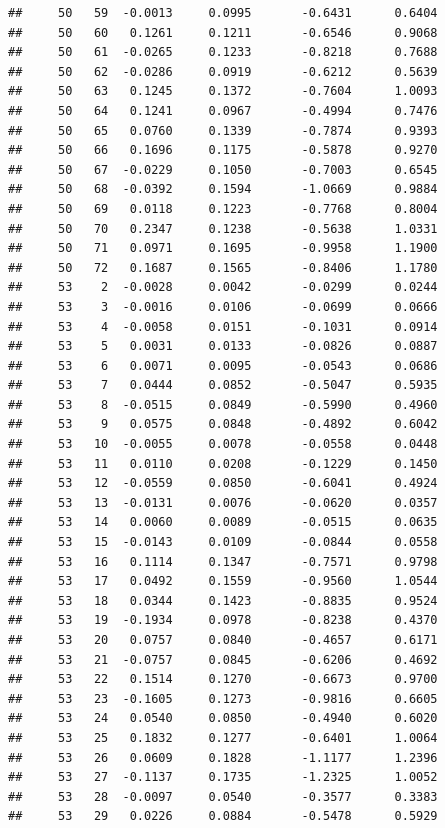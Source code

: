 \documentclass[
]{article}
\begin{document}
\begin{verbatim}
##     50   59  -0.0013     0.0995       -0.6431      0.6404 
##     50   60   0.1261     0.1211       -0.6546      0.9068 
##     50   61  -0.0265     0.1233       -0.8218      0.7688 
##     50   62  -0.0286     0.0919       -0.6212      0.5639 
##     50   63   0.1245     0.1372       -0.7604      1.0093 
##     50   64   0.1241     0.0967       -0.4994      0.7476 
##     50   65   0.0760     0.1339       -0.7874      0.9393 
##     50   66   0.1696     0.1175       -0.5878      0.9270 
##     50   67  -0.0229     0.1050       -0.7003      0.6545 
##     50   68  -0.0392     0.1594       -1.0669      0.9884 
##     50   69   0.0118     0.1223       -0.7768      0.8004 
##     50   70   0.2347     0.1238       -0.5638      1.0331 
##     50   71   0.0971     0.1695       -0.9958      1.1900 
##     50   72   0.1687     0.1565       -0.8406      1.1780 
##     53    2  -0.0028     0.0042       -0.0299      0.0244 
##     53    3  -0.0016     0.0106       -0.0699      0.0666 
##     53    4  -0.0058     0.0151       -0.1031      0.0914 
##     53    5   0.0031     0.0133       -0.0826      0.0887 
##     53    6   0.0071     0.0095       -0.0543      0.0686 
##     53    7   0.0444     0.0852       -0.5047      0.5935 
##     53    8  -0.0515     0.0849       -0.5990      0.4960 
##     53    9   0.0575     0.0848       -0.4892      0.6042 
##     53   10  -0.0055     0.0078       -0.0558      0.0448 
##     53   11   0.0110     0.0208       -0.1229      0.1450 
##     53   12  -0.0559     0.0850       -0.6041      0.4924 
##     53   13  -0.0131     0.0076       -0.0620      0.0357 
##     53   14   0.0060     0.0089       -0.0515      0.0635 
##     53   15  -0.0143     0.0109       -0.0844      0.0558 
##     53   16   0.1114     0.1347       -0.7571      0.9798 
##     53   17   0.0492     0.1559       -0.9560      1.0544 
##     53   18   0.0344     0.1423       -0.8835      0.9524 
##     53   19  -0.1934     0.0978       -0.8238      0.4370 
##     53   20   0.0757     0.0840       -0.4657      0.6171 
##     53   21  -0.0757     0.0845       -0.6206      0.4692 
##     53   22   0.1514     0.1270       -0.6673      0.9700 
##     53   23  -0.1605     0.1273       -0.9816      0.6605 
##     53   24   0.0540     0.0850       -0.4940      0.6020 
##     53   25   0.1832     0.1277       -0.6401      1.0064 
##     53   26   0.0609     0.1828       -1.1177      1.2396 
##     53   27  -0.1137     0.1735       -1.2325      1.0052 
##     53   28  -0.0097     0.0540       -0.3577      0.3383 
##     53   29   0.0226     0.0884       -0.5478      0.5929 

\end{verbatim}
\end{document}
